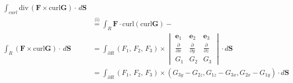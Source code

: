 \documentclass{article}
\newcommand{\parti}[1]{\frac{\partial}{\partial #1}}
\newcommand{\divt}{\text{div} \,}
\begin{document}
\begin{enumerate}
\begin{enumerate}
\begin{align*}
        \int_{curl}  \divt (\boldsymbol F \times \text{curl} 
        \boldsymbol G) \cdot \, d \boldsymbol S \\
        &\overset{\text{(i)}}{=} \int_{R} \boldsymbol F \cdot
        \text{curl}(\text{curl} \boldsymbol G) - \\
        \int_{R} ( \boldsymbol F \times \text{curl} \boldsymbol G) 
        \cdot \, d \boldsymbol S &= \int_{\partial R} (F_1,\, F_2,\, F_3)
        \times 
        \begin{vmatrix}
                \boldsymbol e_1 & \boldsymbol e_2 & \boldsymbol e_3 \\
                \parti{x} & \parti{y} & \parti{z} \\
                G_1 & G_2 & G_3 
        \end{vmatrix} \cdot d \boldsymbol S\\
        &= \int_{\partial R} (F_1,\, F_2,\, F_3) \times 
        (G_{3y} - G_{2z}, G_{1z} - G_{3x}, G_{2x} - G_{1y})
        \cdot d \boldsymbol S\\
        \end{align*} 
    \end{enumerate}
\end{enumerate}
\end{document}
